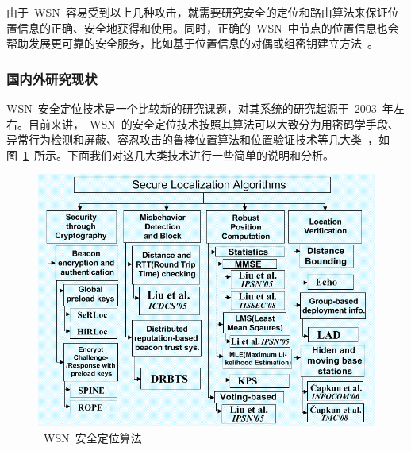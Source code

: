 \documentclass[a4paper,10pt]{article}
\begin{document}
由于~WSN~容易受到以上几种攻击，就需要研究安全的定位和路由算法来保证位置信息的正确、安全地获得和使用。同时，正确的~WSN~中节点的位置信息也会帮助发展更可靠的安全服务，比如基于位置信息的对偶或组密钥建立方法~\cite{Liu2003,Huang2004}。

\subsubsection{国内外研究现状}  

WSN~安全定位技术是一个比较新的研究课题，对其系统的研究起源于~2003~年左右。目前来讲，~WSN~的安全定位技术按照其算法可以大致分为用密码学手段、异常行为检测和屏蔽、容忍攻击的鲁棒位置算法和位置验证技术等几大类~\cite{Boukerche2008}，如图~\ref{wsn_sec_pos}~所示。下面我们对这几大类技术进行一些简单的说明和分析。

\begin{figure}[htbp]
  \centering
  \includegraphics[width=.9\textwidth,keepaspectratio]{wsn_sec_pos}
  \caption{\label{wsn_sec_pos}~WSN~安全定位算法}
\end{figure}
\end{document}
